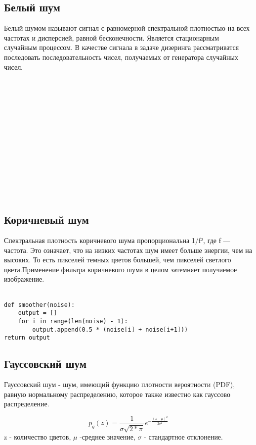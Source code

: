 \subsection{Белый шум}
Белый шумом называют сигнал с равномерной спектральной плотностью на всех частотах и дисперсией, равной бесконечности. Является стационарным случайным процессом.
В качестве сигнала в задаче дизеринга  рассматриватся последовать последовательность чисел, получаемых от генератора случайных чисел.
\\\\\\\\\\\\\\\\\\\\\\\\\\\

\subsection{Коричневый шум}
Спектральная плотность коричневого шума пропорциональна 1/f², где f — частота.																									
Это означает, что на низких частотах шум имеет больше энергии, чем на высоких. То есть пикселей темных цветов большей, чем пикселей светлого цвета.Применение фильтра коричневого шума в целом затемняет получаемое изображение.
\\\

\begin{lstlisting}[style=pseudocode,caption={Получение коричневого шума}] 
def smoother(noise):
    output = []
    for i in range(len(noise) - 1):
        output.append(0.5 * (noise[i] + noise[i+1]))
return output
\end{lstlisting}

\subsection{Гауссовский шум}

Гауссовский шум  - шум, имеющий функцию плотности вероятности (PDF), равную нормальному распределению, которое также известно как гауссово распределение. 

\begin{equation}
p_g(z)=\frac{1}{\sigma\sqrt{2*\pi}}e^{-\frac{(z-\mu)^2}{2\sigma^2}}
\end{equation}
z - количество цветов, $\mu$ -среднее значение, $\sigma$ - стандартное отклонение.
